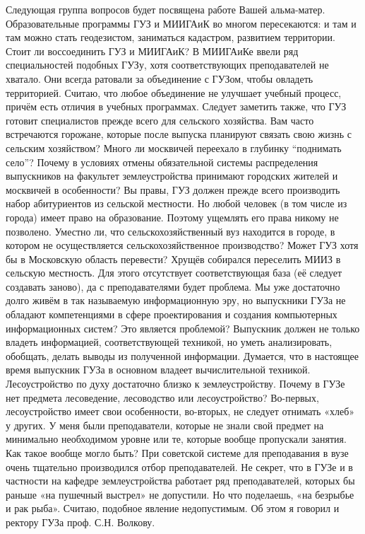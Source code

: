 \begin{drama}
	\maxspeaks Следующая группа вопросов будет посвящена работе Вашей альма-матер. Образовательные программы ГУЗ и МИИГАиК во многом пересекаются: и там и там можно стать геодезистом, заниматься кадастром, развитием территории. Стоит ли воссоединить ГУЗ и МИИГАиК? 
	\michaelspeaks В МИИГАиКе ввели ряд специальностей подобных ГУЗу, хотя соответствующих преподавателей не хватало. Они всегда ратовали за объединение с ГУЗом, чтобы овладеть территорией. Считаю, что любое объединение не улучшает учебный процесс, причём есть отличия в учебных программах. Следует заметить также, что ГУЗ готовит специалистов прежде всего для сельского хозяйства.
	\maxspeaks Вам часто встречаются горожане, которые после выпуска планируют связать свою жизнь с сельским хозяйством? Много ли москвичей переехало в глубинку “поднимать село”? Почему в условиях отмены обязательной системы распределения выпускников на факультет землеустройства принимают городских жителей и москвичей в особенности? 
	\michaelspeaks Вы правы, ГУЗ должен прежде всего производить набор абитуриентов из сельской местности. Но любой человек (в том числе из города) имеет право на образование. Поэтому ущемлять его права никому не позволено. 
	\maxspeaks Уместно ли, что сельскохозяйственный вуз находится в городе, в котором не осуществляется сельскохозяйственное производство? Может ГУЗ хотя бы в Московскую область перевести?
	\michaelspeaks Хрущёв собирался переселить МИИЗ в сельскую местность. Для этого отсутствует соответствующая база (её следует создавать заново), да с преподавателями будет проблема.
	\maxspeaks Мы уже достаточно долго живём в так называемую информационную эру, но выпускники ГУЗа не обладают компетенциями в сфере проектирования и создания компьютерных информационных систем? Это является проблемой?
	\michaelspeaks Выпускник должен не только владеть информацией, соответствующей техникой, но уметь анализировать, обобщать, делать выводы из полученной информации. Думается, что в настоящее время выпускник ГУЗа в основном владеет вычислительной техникой.
	\maxspeaks Лесоустройство по духу достаточно близко к землеустройству. Почему в ГУЗе нет предмета лесоведение, лесоводство или лесоустройство?
	\michaelspeaks Во-первых, лесоустройство имеет свои особенности, во-вторых, не следует отнимать «хлеб» у других.
	\maxspeaks У меня были преподаватели, которые не знали свой предмет на минимально необходимом уровне или те, которые вообще пропускали занятия. Как такое вообще могло быть? 
	\michaelspeaks При советской системе для преподавания в вузе очень тщательно производился отбор преподавателей. Не секрет, что в ГУЗе и в частности на кафедре землеустройства работает ряд преподавателей, которых бы раньше «на пушечный выстрел» не допустили. Но что поделаешь, «на безрыбье и рак рыба». Считаю, подобное явление недопустимым. Об этом я говорил и ректору ГУЗа проф. С.Н. Волкову.

\end{drama}
